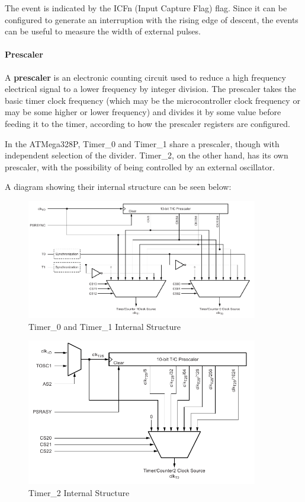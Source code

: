 The event is indicated by the ICFn (Input Capture Flag) flag. Since it can be configured to generate an interruption with the rising edge of descent, the events can be useful to measure the width of external pulses.

\clearpage

\paragraph{Prescaler}

A \textbf{prescaler} is an electronic counting circuit used to reduce a high frequency electrical signal to a lower frequency by integer division. The prescaler takes the basic timer clock frequency (which may be the microcontroller clock frequency or may be some higher or lower frequency) and divides it by some value before feeding it to the timer, according to how the prescaler registers are configured.\medskip

In the ATMega328P, Timer\_0 and Timer\_1 share a prescaler, though with independent selection of the divider. Timer\_2, on the other hand, has its own prescaler, with the possibility of being controlled by an external oscillator.\medskip

A diagram showing their internal structure can be seen below:

\begin{figure}[H]
    \centering
    \includegraphics[width = 0.9\textwidth]{Graphics/MICROS/Practice 4/DATASHEET/TIMER10.pdf}
    \caption{Timer\_0 and Timer\_1 Internal Structure}
    \label{fig:TIMER10_PRESCALER}
\end{figure}

\begin{figure}[H]
    \centering
    \includegraphics[width = 0.9\textwidth]{Graphics/MICROS/Practice 4/DATASHEET/TIMER2.pdf}
    \caption{Timer\_2 Internal Structure}
    \label{fig:TIMER2_PRESCALER}
\end{figure}


